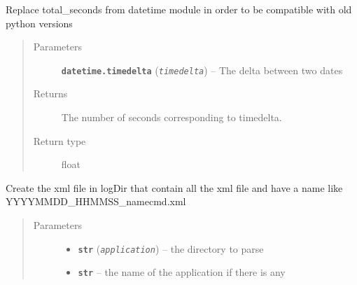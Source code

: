 \documentclass[a4paper,10pt,english]{sphinxmanual}
\begin{document}

\begin{fulllineitems}
\label{commands/apidoc/src:src.utilsSat.timedelta_total_seconds}
Replace total\_seconds from datetime module 
in order to be compatible with old python versions
\begin{quote}\begin{description}
\item[{Parameters}] \leavevmode
\textbf{\texttt{datetime.timedelta}} (\emph{\texttt{timedelta}}) -- The delta between two dates

\item[{Returns}] \leavevmode
The number of seconds corresponding to timedelta.

\item[{Return type}] \leavevmode
float

\end{description}\end{quote}

\end{fulllineitems}


\begin{fulllineitems}
\label{commands/apidoc/src:src.utilsSat.update_hat_xml}
Create the xml file in logDir that contain all the xml file 
and have a name like YYYYMMDD\_HHMMSS\_namecmd.xml
\begin{quote}\begin{description}
\item[{Parameters}] \leavevmode\begin{itemize}
\item {} 
\textbf{\texttt{str}} (\emph{\texttt{application}}) -- the directory to parse

\item {} 
\textbf{\texttt{str}} -- the name of the application if there is any

\end{itemize}

\end{description}\end{quote}

\end{fulllineitems}
\end{document}

